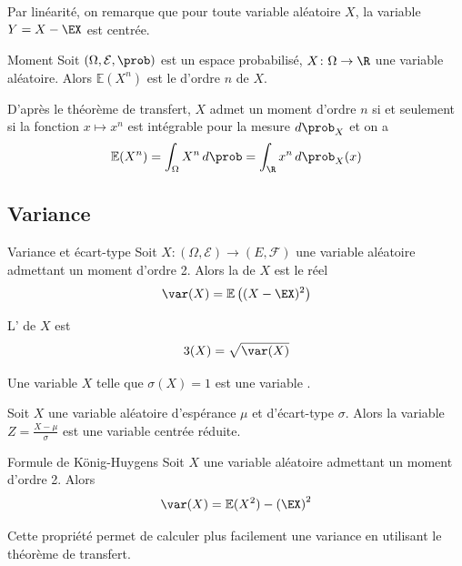 Par linéarité, on remarque que pour toute variable aléatoire $X$, la variable $Y=X - \EX$ est centrée.

\begin{definition}{Moment}{}
	Soit $(\Omega,\mathcal{E},\prob)$ est un espace probabilisé, $X \colon \Omega \to \R $ une variable aléatoire. Alors $\mathbb{E}(X^n)$ est le  d'ordre $n$ de $X$.
\end{definition}

\begin{proposition}{}{}
	D'après le théorème de transfert, $X$ admet un moment d'ordre $n$ si et seulement si la fonction $x \mapsto x^n$ est intégrable pour la mesure $d\prob_X$ et on a 
	$$\mathbb{E}(X^n) = \int_\Omega X^n \, d\prob = \int_{\R}^{} x^n \, d\prob_X(x)$$
\end{proposition}


\subsection{Variance}

\begin{definition}{Variance et écart-type}{}
	Soit $X \colon (\Omega,\mathcal{E}) \to (E,\mathcal{F})$ une variable aléatoire admettant un moment d'ordre 2. Alors la  de $X$ est le réel
	$$\var(X)=\mathbb{E}\left((X-\EX)^2\right)$$
	
	L' de $X$ est 
	$$\sigma(X)=\sqrt{\var(X)}$$
\end{definition}

\begin{definition}{}{}
	Une variable $X$ telle que $\sigma(X)=1$ est une variable . 
\end{definition}

\begin{proposition}{}{}
	Soit $X$ une variable aléatoire d'espérance $\mu$ et d'écart-type $\sigma$. Alors la variable $Z=\frac{X-\mu}{\sigma}$ est une variable centrée réduite.
\end{proposition}

\begin{proposition}{Formule de König-Huygens}
	Soit $X$ une variable aléatoire admettant un moment d'ordre 2. Alors 
	$$\var(X)=\mathbb{E}(X^2)-\left(\EX\right)^2$$
\end{proposition}

Cette propriété permet de calculer plus facilement une variance en utilisant le théorème de transfert.

